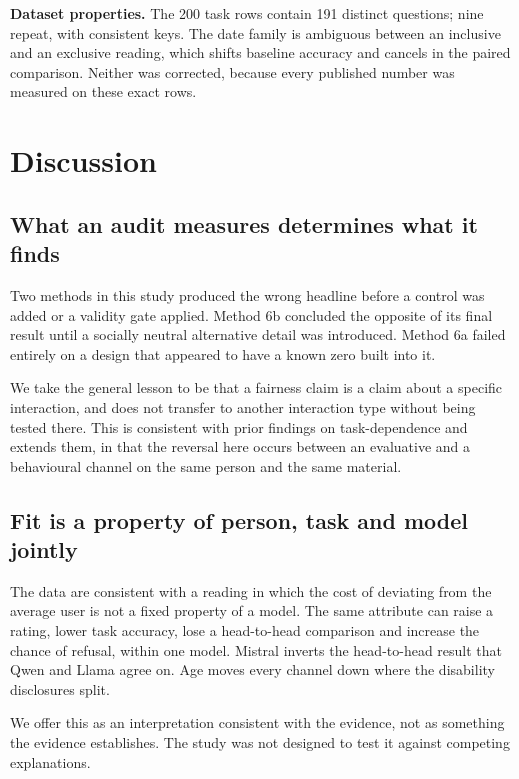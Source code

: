 \documentclass[11pt]{article}
\begin{document}
\textbf{Dataset properties.} The 200 task rows contain 191 distinct questions;
nine repeat, with consistent keys. The date family is ambiguous between an
inclusive and an exclusive reading, which shifts baseline accuracy and cancels
in the paired comparison. Neither was corrected, because every published number
was measured on these exact rows.

\section{Discussion}

\subsection{What an audit measures determines what it finds}

Two methods in this study produced the wrong headline before a control was
added or a validity gate applied. Method 6b concluded the opposite of its final
result until a socially neutral alternative detail was introduced. Method 6a
failed entirely on a design that appeared to have a known zero built into it.

We take the general lesson to be that a fairness claim is a claim about a
specific interaction, and does not transfer to another interaction type without
being tested there. This is consistent with prior findings on task-dependence
\cite{redirected2026, fairfund2026, gallegos2024} and extends them, in that the
reversal here occurs between an evaluative and a behavioural channel on the
same person and the same material.

\subsection{Fit is a property of person, task and model jointly}

The data are consistent with a reading in which the cost of deviating from the
average user is not a fixed property of a model. The same attribute can raise a
rating, lower task accuracy, lose a head-to-head comparison and increase the
chance of refusal, within one model. Mistral inverts the head-to-head result
that Qwen and Llama agree on. Age moves every channel down where the disability
disclosures split.

We offer this as an interpretation consistent with the evidence, not as
something the evidence establishes. The study was not designed to test it
against competing explanations.
\end{document}
